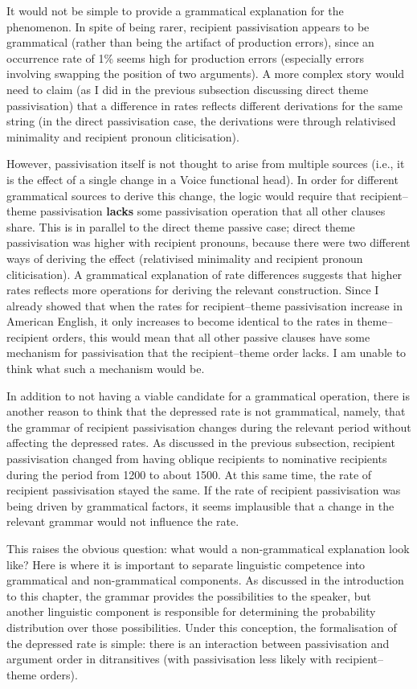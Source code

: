 	It would not be simple to provide a grammatical explanation for the phenomenon. In spite of being rarer, recipient passivisation appears to be grammatical (rather than being the artifact of production errors), since an occurrence rate of 1\% seems high for production errors (especially errors involving swapping the position of two arguments). A more complex story would need to claim (as I did in the previous subsection discussing direct theme passivisation) that a difference in rates reflects different derivations for the same string (in the direct passivisation case, the derivations were through relativised minimality and recipient pronoun cliticisation). 
	
	However, passivisation itself is not thought to arise from multiple sources (i.e., it is the effect of a single change in a Voice functional head). In order for different grammatical sources to derive this change, the logic would require that recipient--theme passivisation \textbf{lacks} some passivisation operation that all other clauses share. This is in parallel to the direct theme passive case; direct theme passivisation was higher with recipient pronouns, because there were two different ways of deriving the effect (relativised minimality and recipient pronoun cliticisation). A grammatical explanation of rate differences suggests that higher rates reflects more operations for deriving the relevant construction. Since I already showed that when the rates for recipient--theme passivisation increase in American English, it only increases to become identical to the rates in theme--recipient orders, this would mean that all other passive clauses have some mechanism for passivisation that the recipient--theme order lacks. I am unable to think what such a mechanism would be.

	In addition to not having a viable candidate for a grammatical operation, there is another reason to think that the depressed rate is not grammatical, namely, that the grammar of recipient passivisation changes during the relevant period without affecting the depressed rates. As discussed in the previous subsection, recipient passivisation changed from having oblique recipients to nominative recipients during the period from 1200 to about 1500. At this same time, the rate of recipient passivisation stayed the same. If the rate of recipient passivisation was being driven by grammatical factors, it seems implausible that a change in the relevant grammar would not influence the rate.

	This raises the obvious question: what would a non-grammatical explanation look like? Here is where it is important to separate linguistic competence into grammatical and non-grammatical components. As discussed in the introduction to this chapter, the grammar provides the possibilities to the speaker, but another linguistic component is responsible for determining the probability distribution over those possibilities. Under this conception, the formalisation of the depressed rate is simple: there is an interaction between passivisation and argument order in ditransitives (with passivisation less likely with recipient--theme orders). 

